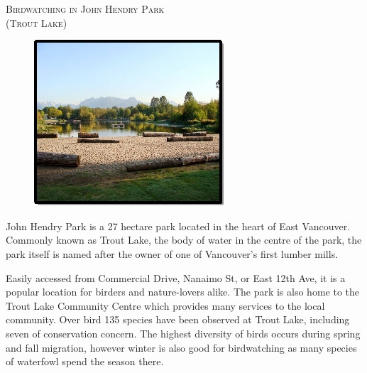 

\begin{center}
\textsc{\LARGE Birdwatching in John Hendry Park}\\[0.2cm]
\textsc{\Large (Trout Lake)}\\[0.2cm]
\end{center}

\begin{figure}[h]
  \centering
    \includegraphics{tlcover.jpg}
\end{figure}

\large
John Hendry Park is a 27 hectare park located in the heart of East Vancouver. 
Commonly known as Trout Lake, the body of water in the centre of the park, the 
park itself is named after the owner of one of Vancouver's first lumber mills. 

Easily accessed from Commercial Drive, Nanaimo St, or East 12th Ave, it is a popular location 
for birders and nature-lovers alike. The park is also home to the 
Trout Lake Community Centre which provides many services to the local community. 
Over bird 135 species have been observed at Trout Lake, including seven of conservation concern.
The highest diversity of birds occurs during spring and fall migration, however
winter is also good for birdwatching as many species of waterfowl spend the season there.

